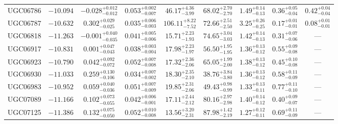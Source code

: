 \documentclass[twocolumn,tighten]{aastex63}
\begin{document}
\begin{table}
\begin{center}
\begin{tabular}{lcccccccc}
   UGC06786 & $ -10.094  $ & $ -0.028 _{ -0.012 } ^{ + 0.012 } $ & $ 0.053 _{ -0.007 } ^{ + 0.002 } $ & $ 46.17 _{ -3.99 } ^{ + 4.36 } $ & $ 68.02 _{ -2.70 } ^{ + 2.70 } $ & $ 1.49 _{ -0.13 } ^{ + 0.14 } $ & $ 0.36 _{ -0.04 } ^{ + 0.05 } $ & $ 0.42 _{ -0.04 } ^{ + 0.04 } $  \\  
   UGC06787 & $ -10.632  $ & $ 0.302 _{ -0.025 } ^{ + 0.029 } $ & $ 0.035 _{ -0.003 } ^{ + 0.006 } $ & $ 106.11 _{ -7.52 } ^{ + 8.22 } $ & $ 72.66 _{ -2.50 } ^{ + 2.51 } $ & $ 3.25 _{ -0.25 } ^{ + 0.26 } $ & $ 0.17 _{ -0.01 } ^{ + 0.01 } $ & $ 0.08 _{ -0.01 } ^{ + 0.01 } $  \\  
   UGC06818 & $ -11.263 $ & $ -0.001 _{ -0.035 } ^{ + 0.040 } $ & $ 0.041 _{ -0.006 } ^{ + 0.005 } $ & $ 15.71 _{ -1.93 } ^{ + 2.23 } $ & $ 74.65 _{ -3.03 } ^{ + 3.04 } $ & $ 1.42 _{ -0.13 } ^{ + 0.14 } $ & $ 0.31 _{ -0.06 } ^{ + 0.07 } $ & --- \\  
   UGC06917 & $ -10.831 $ & $ 0.001 _{ -0.043 } ^{ + 0.047 } $ & $ 0.038 _{ -0.004 } ^{ + 0.003 } $ & $ 17.98 _{ -1.97 } ^{ + 2.23 } $ & $ 56.50 _{ -1.95 } ^{ + 1.95 } $ & $ 1.36 _{ -0.12 } ^{ + 0.13 } $ & $ 0.55 _{ -0.08 } ^{ + 0.09 } $ & --- \\  
   UGC06923 & $ -10.790 $ & $ 0.042 _{ -0.072 } ^{ + 0.092 } $ & $ 0.052 _{ -0.008 } ^{ + 0.007 } $ & $ 17.32 _{ -2.06 } ^{ + 2.36 } $ & $ 65.05 _{ -2.00 } ^{ + 1.99 } $ & $ 1.38 _{ -0.12 } ^{ + 0.13 } $ & $ 0.45 _{ -0.08 } ^{ + 0.10 } $ & --- \\  
   UGC06930 & $ -11.033 $ & $ 0.259 _{ -0.106 } ^{ + 0.130 } $ & $ 0.034 _{ -0.002 } ^{ + 0.007 } $ & $ 18.30 _{ -2.10 } ^{ + 2.35 } $ & $ 38.76 _{ -3.80 } ^{ + 3.84 } $ & $ 1.36 _{ -0.12 } ^{ + 0.13 } $ & $ 0.58 _{ -0.09 } ^{ + 0.11 } $ & --- \\  
   UGC06983 & $ -10.952 $ & $ 0.059 _{ -0.036 } ^{ + 0.040 } $ & $ 0.051 _{ -0.009 } ^{ + 0.007 } $ & $ 19.85 _{ -2.06 } ^{ + 2.31 } $ & $ 49.43 _{ -0.99 } ^{ + 0.98 } $ & $ 1.33 _{ -0.11 } ^{ + 0.13 } $ & $ 0.77 _{ -0.10 } ^{ + 0.11 } $ & --- \\  
   UGC07089 & $ -11.166 $ & $ 0.102 _{ -0.055 } ^{ + 0.073 } $ & $ 0.042 _{ -0.001 } ^{ + 0.006 } $ & $ 17.11 _{ -2.12 } ^{ + 2.44 } $ & $ 80.16 _{ -2.98 } ^{ + 2.97 } $ & $ 1.40 _{ -0.12 } ^{ + 0.14 } $ & $ 0.40 _{ -0.07 } ^{ + 0.09 } $ & --- \\  
   UGC07125 & $ -11.386 $ & $ 0.132 _{ -0.050 } ^{ + 0.075 } $ & $ 0.052 _{ -0.008 } ^{ + 0.010 } $ & $ 13.56 _{ -2.31 } ^{ + 3.20 } $ & $ 87.98 _{ -2.19 } ^{ + 1.42 } $ & $ 1.27 _{ -0.11 } ^{ + 0.12 } $ & $ 0.69 _{ -0.09 } ^{ + 0.11 } $ & --- \\  

\end{tabular}
\end{center}
\end{table}
\end{document}
